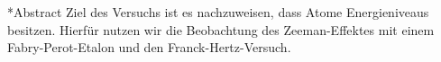 \documentclass[pdftex, a4paper,11pt, twoside, ngerman]{report}
\begin{document}
  
  
  
  
  
  
  
  
  \begin{chapter}*{Abstract}
    Ziel des Versuchs ist es nachzuweisen, dass Atome Energieniveaus besitzen.
    Hierfür nutzen wir die Beobachtung des Zeeman-Effektes mit einem
    Fabry-Perot-Etalon und den Franck-Hertz-Versuch.

    
    
  \end{chapter}
  
  \tableofcontents
  
  
  
\end{document}
